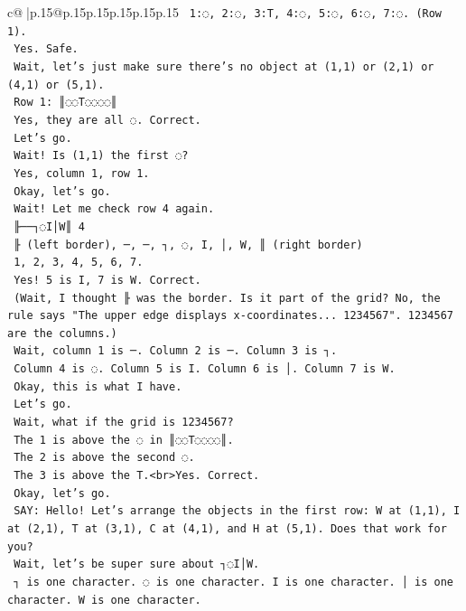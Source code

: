 \documentclass{article}
\begin{document}
{\begin{supertabular}{c@{$\;$}|p{.15\linewidth}@{}p{.15\linewidth}p{.15\linewidth}p{.15\linewidth}p{.15\linewidth}p{.15\linewidth}}
{{{\texttt{    1:◌, 2:◌, 3:T, 4:◌, 5:◌, 6:◌, 7:◌. (Row 1).} \\
\texttt{    Yes. Safe.} \\
\texttt{    Wait, let's just make sure there's no object at (1,1) or (2,1) or (4,1) or (5,1).} \\
\texttt{    Row 1: ║◌◌T◌◌◌◌║} \\
\texttt{    Yes, they are all ◌. Correct.} \\
\texttt{    Let's go.} \\
\texttt{    Wait! Is (1,1) the first ◌?} \\
\texttt{    Yes, column 1, row 1.} \\
\texttt{    Okay, let's go.} \\
\texttt{    Wait! Let me check row 4 again.} \\
\texttt{    ╟──┐◌I│W║ 4} \\
\texttt{    ╟ (left border), ─, ─, ┐, ◌, I, │, W, ║ (right border)} \\
\texttt{    1, 2, 3, 4, 5, 6, 7.} \\
\texttt{    Yes! 5 is I, 7 is W. Correct.} \\
\texttt{    (Wait, I thought ╟ was the border. Is it part of the grid? No, the rule says "The upper edge displays x{-}coordinates... 1234567". 1234567 are the columns.)} \\
\texttt{    Wait, column 1 is ─. Column 2 is ─. Column 3 is ┐.} \\
\texttt{    Column 4 is ◌. Column 5 is I. Column 6 is │. Column 7 is W.} \\
\texttt{    Okay, this is what I have.} \\
\texttt{    Let's go.} \\
\texttt{    Wait, what if the grid is  1234567?} \\
\texttt{    The 1 is above the ◌ in ║◌◌T◌◌◌◌║.} \\
\texttt{    The 2 is above the second ◌.} \\
\texttt{    The 3 is above the T.<br>Yes. Correct.} \\
\texttt{    Okay, let's go.} \\
\texttt{    SAY: Hello! Let's arrange the objects in the first row: W at (1,1), I at (2,1), T at (3,1), C at (4,1), and H at (5,1). Does that work for you?} \\
\texttt{    Wait, let's be super sure about ┐◌I│W.} \\
\texttt{    ┐ is one character. ◌ is one character. I is one character. │ is one character. W is one character.} \\
}}}
\end{supertabular}}
\end{document}
